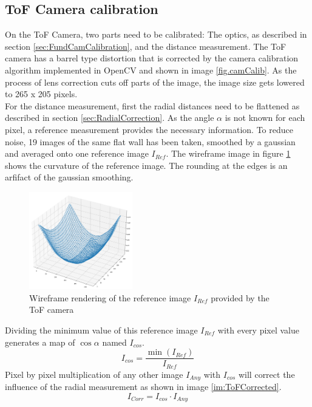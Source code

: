 \subsection{ToF Camera calibration}
\label{sec:ToFCalibration}
On the ToF Camera, two parts need to be calibrated: The optics, as described in section \ref{sec:FundCamCalibration}, and the distance measurement. The ToF camera has a barrel type distortion that is corrected by the camera calibration algorithm implemented in OpenCV\cite{openCVCamCalib} and shown in image \ref{fig.camCalib}. As the process of lens correction cuts off parts of the image, the image size gets lowered to 265 x 205 pixels.\\
For the distance measurement, first the radial distances need to be flattened as described in section \ref{sec:RadialCorrection}. As the angle $\alpha$ is not known for each pixel, a reference measurement provides the necessary information. To reduce noise, 19 images of the same flat wall has been taken, smoothed by a gaussian and averaged onto one reference image $I_{Ref}$. The wireframe image in figure \ref{im:ToFRaw} shows the curvature of the reference image. The rounding at the edges is an arfifact of the gaussian smoothing.\\
\begin{figure}[H]
    \centering
    \includegraphics[width=0.4\textwidth]{images/raw_tof_radial.png}
    \caption{Wireframe rendering of the reference image $I_{Ref}$ provided by the ToF camera}
    \label{im:ToFRaw}
\end{figure}
Dividing the minimum value of this reference image $I_{Ref}$ with every pixel value generates a map of $\cos \alpha$ named $I_{cos}$.
\begin{equation*}
    I_{cos} = \frac{\min (I_{Ref}) }{I_{Ref}} 
\end{equation*}
Pixel by pixel multiplication of any other image $I_{Any}$ with $I_{cos}$ will correct the influence of the radial measurement as shown in image \ref{im:ToFCorrected}. 
\begin{equation*}
    I_{Corr} = I_{cos}\cdot I_{Any}
\end{equation*}

